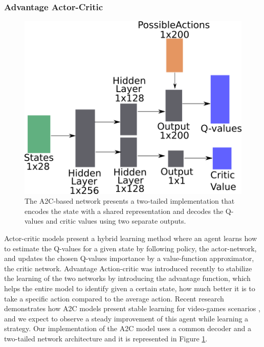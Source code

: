 \documentclass[a4paper,conference]{IEEEtran}
\begin{document}



\subsubsection{Advantage Actor-Critic}

\begin{figure}
    \centering
    \includegraphics[width=0.8\columnwidth]{A2CNetwork.png}
    \caption{The A2C-based network presents a two-tailed implementation that encodes the state with a shared representation and decodes the Q-values and critic values using two separate outputs.}
    \label{fig:a2cNetwork}
\end{figure}

Actor-critic models present a hybrid learning method where an agent learns how to estimate the Q-values for a given state by following policy, the actor-network, and updates the chosen Q-values importance by a value-function approximator, the critic network. Advantage Action-critic \cite{mnih2016asynchronous} was introduced recently to stabilize the learning of the two networks by introducing the advantage function, which helps the entire model to identify given a certain state, how much better it is to take a specific action compared to the average action. Recent research demonstrates how A2C models present stable learning for video-games scenarios \cite{clary2019let}, and we expect to observe a steady improvement of this agent while learning a strategy. Our implementation of the A2C model uses a common decoder and a two-tailed network architecture and it is represented in Figure \ref{fig:a2cNetwork}. 
\end{document}
